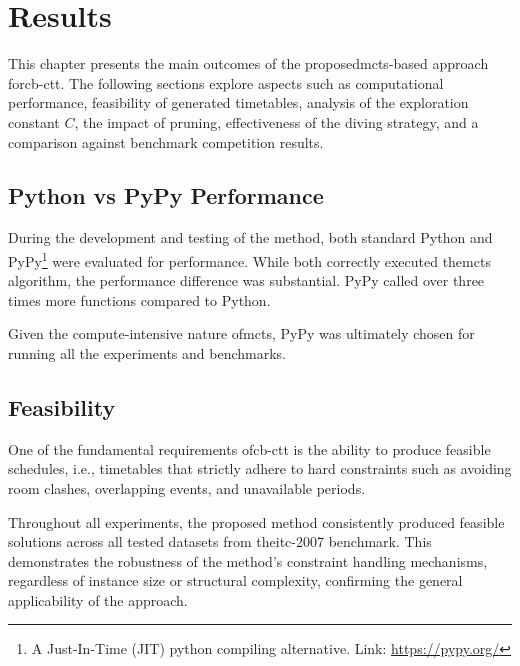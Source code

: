 \pretocmd{\chapter}{\glsresetall}{}{}

\chapter{Results}

\label{Results}

This chapter presents the main outcomes of the proposed\ac{mcts}-based approach for\ac{cb-ctt}. The following sections explore aspects such as computational performance, feasibility of generated timetables, analysis of the exploration constant \(C\), the impact of pruning, effectiveness of the diving strategy, and a comparison against benchmark competition results.

\section{Python vs PyPy Performance}

During the development and testing of the method, both standard Python and PyPy\footnote{A Just-In-Time (JIT) python compiling alternative. Link: \url{https://pypy.org/}} were evaluated for performance. While both correctly executed the\ac{mcts} algorithm, the performance difference was substantial. PyPy called over three times more functions compared to Python.

Given the compute-intensive nature of\ac{mcts}, PyPy was ultimately chosen for running all the experiments and benchmarks.

\section{Feasibility}

One of the fundamental requirements of\ac{cb-ctt} is the ability to produce feasible schedules, i.e., timetables that strictly adhere to hard constraints such as avoiding room clashes, overlapping events, and unavailable periods.

Throughout all experiments, the proposed method consistently produced feasible solutions across all tested datasets from the\ac{itc-2007} benchmark. This demonstrates the robustness of the method's constraint handling mechanisms, regardless of instance size or structural complexity, confirming the general applicability of the approach.

